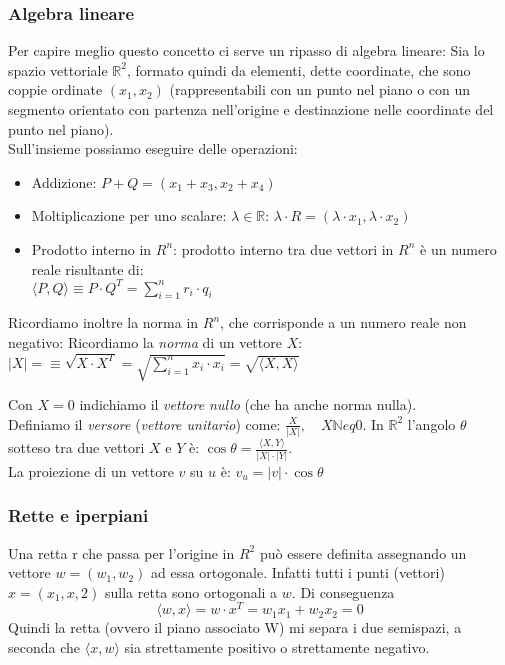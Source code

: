 \subsubsection{Algebra lineare}
Per capire meglio questo concetto ci serve un ripasso di algebra lineare:
Sia lo spazio vettoriale $\mathbb{R}^2$, formato quindi da elementi, dette coordinate, che sono coppie ordinate $(x_1,x_2)$ (rappresentabili con un punto nel piano o con un segmento orientato con partenza nell'origine e destinazione nelle coordinate del punto nel piano).\\ Sull'insieme possiamo eseguire delle operazioni:
\begin{itemize}
    \item Addizione:  $P+Q=(x_1 + x_3, x_2 + x_4)$
    \item Moltiplicazione per uno scalare: $\lambda\in\mathbb{R}$: $\lambda\cdot R=(\lambda\cdot x_1,\lambda\cdot x_2)$
    \item Prodotto interno in $R^n$: prodotto interno tra due vettori in $R^n$ è un numero reale risultante di:         \\ $\langle P,Q\rangle\equiv P\cdot Q^T = \sum_{i=1}^n r_i\cdot q_i$ 
\end{itemize}

Ricordiamo inoltre la norma in $R^n$, che corrisponde a un numero reale non negativo:
Ricordiamo la \textit{norma} di un vettore $X$: $|X|= \equiv \sqrt{X \cdot  X^T}=\sqrt{\displaystyle \sum_{i=1}^n x_i \cdot x_i}=\sqrt{\langle X,X\rangle}$

Con $X=0$ indichiamo il \textit{vettore nullo} (che ha anche norma nulla).\\

Definiamo il \textit{versore} (\textit{vettore unitario}) come: $\frac{X}{|X|},\quad X\mathbb{N}eq 0$. In $\mathbb{R}^2$ l'angolo $\theta$ sotteso tra due vettori $X$ e $Y$ è:  $\cos\theta=\frac{\langle X,Y\rangle}{|X|\cdot |Y|}$. \\  
La proiezione di un vettore $v$ su  $u$ è:  $v_u=|v| \cdot \cos\theta$

\subsubsection{Rette e iperpiani}

Una retta r che passa per l’origine in $R^2$ può essere definita assegnando un vettore $w = (w_1, w_2)$ ad essa ortogonale. Infatti tutti i punti (vettori) $x = (x_1, x,2)$ sulla retta sono ortogonali a $w$. Di conseguenza $$\langle w,x\rangle = w\cdot x^T = w_1x_1 + w_2x_2 = 0$$ 
Quindi la retta (ovvero il piano associato  W) mi separa i due semispazi, a seconda che $\langle x, w\rangle$ sia strettamente positivo o strettamente negativo.\\ 

